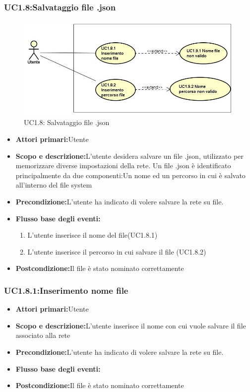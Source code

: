 \subsubsection{UC1.8:Salvataggio file .json}
\begin{figure} [H]
	\centering
	\includegraphics[scale=0.45]{Img/UC1-8}
	\caption{UC1.8: Salvataggio file .json}\label{}
\end{figure}
\begin{itemize}
	\item{\textbf{Attori primari:}Utente}
	\item{\textbf{Scopo e descrizione:}L'utente desidera salvare un file .json, utilizzato per memorizzare diverse impostazioni della rete. Un file .json è identificato principalmente da due componenti:Un nome ed un percorso in cui è salvato all'interno del file system}
	\item{\textbf{Precondizione:}L'utente ha indicato di volere salvare la rete su file.}
	\item{\textbf{Flusso base degli eventi:}}
	\begin{enumerate}
		\item{L'utente inserisce il nome del file(UC1.8.1)}
		\item{L'utente inserisce il percorso in cui salvare il file (UC1.8.2)}
	\end{enumerate}
	\item{\textbf{Postcondizione:}Il file è stato nominato correttamente}
\end{itemize}
\subsubsection{UC1.8.1:Inserimento nome file}
\begin{itemize}
	\item{\textbf{Attori primari:}Utente}
	\item{\textbf{Scopo e descrizione:}L'utente inserisce il nome con cui vuole salvare il file associato alla rete}
	\item{\textbf{Precondizione:}L'utente ha indicato di volere salvare la rete su file.}
	\item{\textbf{Flusso base degli eventi:}}
	\item{\textbf{Postcondizione:}Il file è stato nominato correttamente}
\end{itemize}
